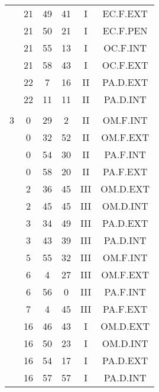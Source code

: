 \documentclass[12pt, a4paper]{article}
\begin{document}
\begin{multicols}{3}
{\begin{tabular}{c c c c c c}
	 	 	 	 & 21 & 49 & 41 & I & EC.F.EXT\\%
	 	 	 	 & 21 & 50 & 21 & I & EC.F.PEN\\%
	 	 	 	 & 21 & 55 & 13 & I & OC.F.INT\\%
	 	 	 	 & 21 & 58 & 43 & I & OC.F.EXT\\%
	 	 	 	 & 22 & 7 & 16 & II & PA.D.EXT\\%
	 	 	 	 & 22 & 11 & 11 & II & PA.D.INT\\%
	 	 	 	 & & & & & \\%
	 	 	 	3 & 0 & 29 & 2 & II & OM.F.INT\\%
	 	 	 	 & 0 & 32 & 52 & II & OM.F.EXT\\%
	 	 	 	 & 0 & 54 & 30 & II & PA.F.INT\\%
	 	 	 	 & 0 & 58 & 20 & II & PA.F.EXT\\%
	 	 	 	 & 2 & 36 & 45 & III & OM.D.EXT\\%
	 	 	 	 & 2 & 45 & 45 & III & OM.D.INT\\%
	 	 	 	 & 3 & 34 & 49 & III & PA.D.EXT\\%
	 	 	 	 & 3 & 43 & 39 & III & PA.D.INT\\%
	 	 	 	 & 5 & 55 & 32 & III & OM.F.INT\\%
	 	 	 	 & 6 & 4 & 27 & III & OM.F.EXT\\%
	 	 	 	 & 6 & 56 & 0 & III & PA.F.INT\\%
	 	 	 	 & 7 & 4 & 45 & III & PA.F.EXT\\%
	 	 	 	 & 16 & 46 & 43 & I & OM.D.EXT\\%
	 	 	 	 & 16 & 50 & 23 & I & OM.D.INT\\%
	 	 	 	 & 16 & 54 & 17 & I & PA.D.EXT\\%
	 	 	 	 & 16 & 57 & 57 & I & PA.D.INT\\%

\end{tabular}}
\end{multicols}
\end{document}
